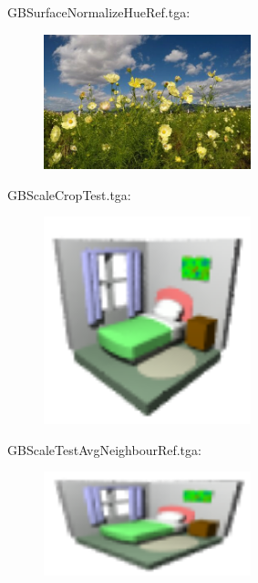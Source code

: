 GBSurfaceNormalizeHueRef.tga:\\
\begin{center}
\begin{figure}[H]
\centering\includegraphics[width=6cm]{./GBSurfaceNormalizeHueRef.png}\\
\end{figure}
\end{center}

GBScaleCropTest.tga:\\
\begin{center}
\begin{figure}[H]
\centering\includegraphics[width=6cm]{./GBScaleCropTest.png}\\
\end{figure}
\end{center}

GBScaleTestAvgNeighbourRef.tga:\\
\begin{center}
\begin{figure}[H]
\centering\includegraphics[width=6cm]{./GBScaleTestAvgNeighbourRef.png}\\
\end{figure}
\end{center}

